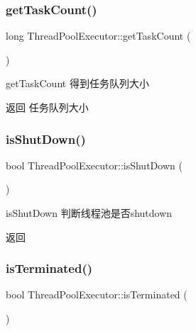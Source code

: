 \subsubsection{\texorpdfstring{get\+Task\+Count()}{getTaskCount()}}
{\footnotesize\ttfamily long Thread\+Pool\+Executor\+::get\+Task\+Count (\begin{DoxyParamCaption}{ }\end{DoxyParamCaption})}



get\+Task\+Count 得到任务队列大小 

\begin{DoxyReturn}{返回}
任务队列大小 
\end{DoxyReturn}
\mbox{\label{classThreadPoolExecutor_ab2306274cb488e3bcf4d14f6042373f7}} 
\subsubsection{\texorpdfstring{is\+Shut\+Down()}{isShutDown()}}
{\footnotesize\ttfamily bool Thread\+Pool\+Executor\+::is\+Shut\+Down (\begin{DoxyParamCaption}{ }\end{DoxyParamCaption})}



is\+Shut\+Down 判断线程池是否shutdown 

\begin{DoxyReturn}{返回}

\end{DoxyReturn}
\mbox{\label{classThreadPoolExecutor_a50e41a2102a9c5193b419e382f383620}} 
\subsubsection{\texorpdfstring{is\+Terminated()}{isTerminated()}}
{\footnotesize\ttfamily bool Thread\+Pool\+Executor\+::is\+Terminated (\begin{DoxyParamCaption}{ }\end{DoxyParamCaption})}



